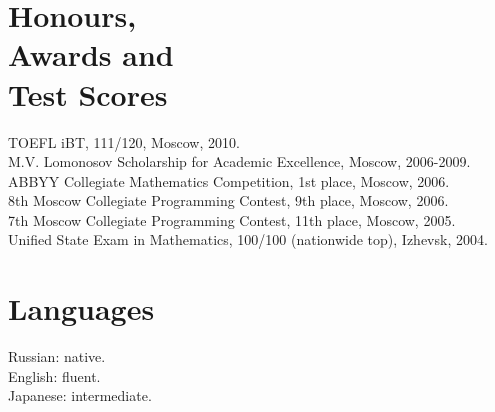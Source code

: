 \documentclass[margin,line]{CV}
\begin{document}
\begin{resume}
    \section{\mysidestyle Honours, \\Awards and \\Test Scores}
    TOEFL iBT, 111/120, Moscow, 2010.                                                               \vspace{1mm}\\
    M.V. Lomonosov Scholarship for Academic Excellence, Moscow, 2006-2009.                          \vspace{1mm}\\
    ABBYY Collegiate Mathematics Competition, 1st place, Moscow, 2006.                              \vspace{1mm}\\
    8th Moscow Collegiate Programming Contest, 9th place, Moscow, 2006.                             \vspace{1mm}\\
    7th Moscow Collegiate Programming Contest, 11th place, Moscow, 2005.                            \vspace{1mm}\\
    Unified State Exam in Mathematics, 100/100 (nationwide top), Izhevsk, 2004.                     \vspace{1mm}


    \section{\mysidestyle Languages}
    Russian: native. \\
    English: fluent. \\
    Japanese: intermediate.

\end{resume}
\end{document}

